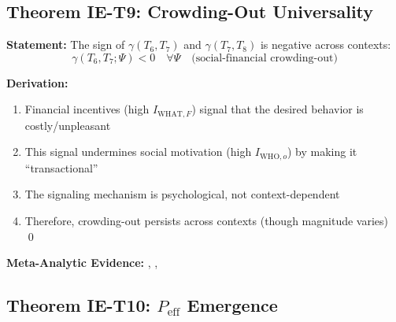\subsection{Theorem IE-T9: Crowding-Out Universality}

\begin{tcolorbox}[colback=green!5!white, colframe=green!75!black,
    title=\textbf{Theorem IE-T9: Crowding-Out is Context-Invariant}]

\textbf{Statement:} The sign of $\gamma(T_6, T_7)$ and $\gamma(T_7, T_8)$ is negative across contexts:
\begin{equation}
\gamma(T_6, T_7; \Psi) < 0 \quad \forall \Psi \quad \text{(social-financial crowding-out)}
\end{equation}

\textbf{Derivation:}
\begin{enumerate}[nosep]
    \item Financial incentives (high $I_{\text{WHAT},F}$) signal that the desired behavior is costly/unpleasant
    \item This signal undermines social motivation (high $I_{\text{WHO},o}$) by making it ``transactional''
    \item The signaling mechanism is psychological, not context-dependent
    \item Therefore, crowding-out persists across contexts (though magnitude varies) \qed
\end{enumerate}

\textbf{Meta-Analytic Evidence:} \citet{frey1997motivation}, \citet{deci1971effects}, \citet{gneezy2000pay}

\end{tcolorbox}

\subsection{Theorem IE-T10: $P_{\text{eff}}$ Emergence}

